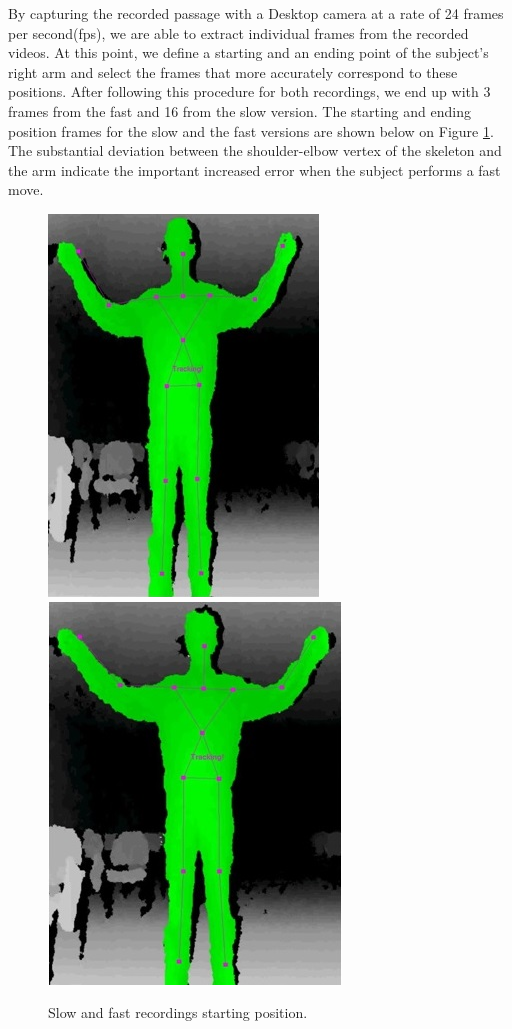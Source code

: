 \documentclass[a4paper]{article}
\begin{document}
By capturing the recorded passage with a Desktop camera at a rate of 24 frames per second(fps), we are able to extract individual frames from the recorded videos. At this point, we define a starting and an ending point of the subject's right arm and select the frames that more accurately correspond to these positions. After following this procedure for both recordings, we end up with 3 frames from the fast and 16 from the slow version. The starting and ending position frames for the slow and the fast versions are shown below on Figure \ref{start_pos}. The substantial deviation between the shoulder-elbow vertex of the skeleton and the arm indicate the important increased error when the subject performs a fast move.

\begin{figure}[h]
\center
\includegraphics[scale=0.5]{SlowStart.jpg} \includegraphics[scale=0.5]{FastStart.jpg}
\caption{Slow and fast recordings starting position.}
\label{start_pos}
\end{figure}
\end{document}
